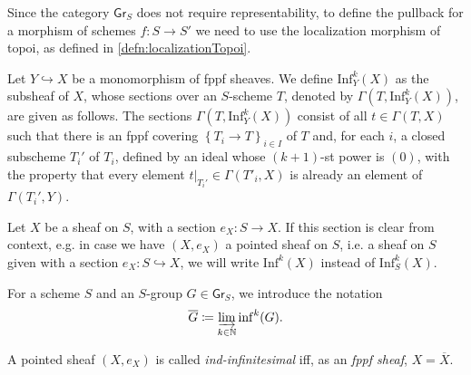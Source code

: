 \begin{rem}[]
	Since the category $\mathsf{Gr}_S$ does not require representability,
	to define the pullback for a morphism of schemes $f\colon S \to S'$
	we need to use the localization morphism of topoi, as defined in
	\cref{defn:localizationTopoi}.
\end{rem}


\begin{defn}\label{defn:kInfNeighbourhood}
	Let $Y \hookrightarrow X$ be a monomorphism of fppf sheaves.
	We define $\mathrm{Inf}_Y^k(X)$ as the subsheaf of $X$,
	whose sections over an $S$-scheme $T$, denoted by $\Gamma ( T , \mathrm{Inf}_Y^k(X) )$,
	are given as follows.
	The sections $\Gamma ( T , \mathrm{Inf}_Y^k(X) )$ consist of all
	$t \in \Gamma \left( T, X \right)$ such that
	there is an fppf covering $\left\{ T_{ i } \to T \right\}_{ i \in I }$
	of $T$ and, for each $i$, a closed subscheme $T_i'$ of $T_i$,
	defined by an ideal whose $(k+1)$-st power is $(0)$,
	with the property that every element $\left.t\right|_{T_i'} \in \Gamma(T'_i, X)$
	is already an element of $\Gamma(T_i', Y)$.
\end{defn}


\begin{ntt}[]
	Let $X$ be a sheaf on $S$, with a section $e_X\colon S \to X$.
	If this section is clear from context, e.g. in case we have
	$(X, e_X)$ a pointed sheaf on $S$, i.e. a sheaf on $S$
	given with a section $e_X\colon S \hookrightarrow X$,
	we will write $\mathrm{Inf}^k(X)$
	instead of $\mathrm{Inf}_S^k(X)$.
\end{ntt}


\begin{ntt}\label{not:GBar}
	For a scheme $S$ and an $S$-group $G \in \mathsf{Gr}_S$, we introduce
	the notation 
	\begin{equation*}
	\overline{G} \coloneqq \varinjlim_{k \in \mathbb{N}} \mathrm{inf}^k(G)
	.\end{equation*}
\end{ntt} 


\begin{defn}
	A pointed sheaf $\left(X, e_X\right)$ is called {\em ind-infinitesimal} iff,
	as an {\em fppf sheaf}, $X = \overline{X}$.
\end{defn}


